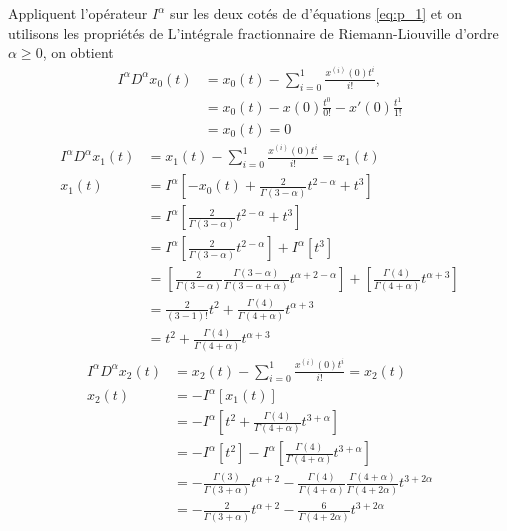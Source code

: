 Appliquent l'opérateur $I^{\alpha}$ sur les deux cotés de d'équations \ref{eq:p_1} et on utilisons les propriétés de L'intégrale fractionnaire de Riemann-Liouville d'ordre $\alpha \geq 0$, on obtient 
\begin{align*}
    I^\alpha D^{\alpha} x_0(t) &= x_0(t)-\sum_{i=0}^1 \frac{x^{(i)}(0) t^i}{i!},\\
    &= x_0(t)-x(0)\frac{t^0}{0!}-x'(0)\frac{t^1}{1!}\\
    &= x_0(t) = 0
\end{align*}
\begin{align*}
    I^{\alpha}D^{\alpha}x_1(t)&=x_1(t)-\sum_{i=0}^1 \frac{x^{(i)}(0) t^i}{i!} = x_1(t)\\
    x_1(t) &= I^{\alpha} \left[-x_0(t)+\frac{2}{\Gamma(3-\alpha)}t^{2-\alpha}+t^3\right]\\
    & = I^{\alpha} \left[\frac{2}{\Gamma(3-\alpha)}t^{2-\alpha}+t^3\right]\\
    & = I^{\alpha} \left[\frac{2}{\Gamma(3-\alpha)}t^{2-\alpha}\right]+I^{\alpha}\left[t^3\right]\\
    &= \left[\frac{2}{\Gamma(3-\alpha)} \frac{\Gamma(3-\alpha)}{\Gamma(3-\alpha + \alpha)}t^{\alpha+2-\alpha}\right] + \left[\frac{\Gamma(4)}{\Gamma(4+\alpha)}t^{\alpha+3} \right]\\
    &= \frac{2}{(3-1)!} t^2 + \frac{\Gamma(4)}{\Gamma(4+\alpha)} t^{\alpha +3}\\
    &= t^2 + \frac{\Gamma(4)}{\Gamma(4+\alpha)}t^{\alpha+3}
\end{align*}
\begin{align*}
    I^{\alpha}D^{\alpha}x_2(t)&=x_2(t)-\sum_{i=0}^1 \frac{x^{(i)}(0) t^i}{i!} = x_2(t)\\
    x_2(t) &= -I^{\alpha}[x_1(t)]\\
    &= -I^{\alpha} \left[t^2 + \frac{\Gamma(4)}{\Gamma(4+\alpha)}t^{3+\alpha} \right]\\
    &= -I^{\alpha}\left[t^2\right] -I^{\alpha} \left[\frac{\Gamma(4)}{\Gamma(4+\alpha)}t^{3+\alpha} \right]\\
    &= -\frac{\Gamma(3)}{\Gamma(3+\alpha)}t^{\alpha+2} - \frac{\Gamma(4)}{\Gamma(4+\alpha)}\frac{\Gamma(4+\alpha)}{\Gamma(4+2\alpha)}t^{3+2\alpha}\\
    &= -\frac{2}{\Gamma(3+\alpha)} t^{\alpha+2} - \frac{6}{\Gamma(4+2\alpha)}t^{3+2\alpha}\\
\end{align*}
